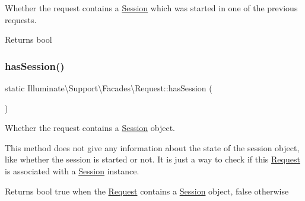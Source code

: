 Whether the request contains a \mbox{\hyperlink{class_illuminate_1_1_support_1_1_facades_1_1_session}{Session}} which was started in one of the previous requests.

\begin{DoxyReturn}{Returns}
bool 
\end{DoxyReturn}
\mbox{\label{class_illuminate_1_1_support_1_1_facades_1_1_request_abdb40f9f98e0988e0d46701d84b08eaa}} 
\subsubsection{\texorpdfstring{has\+Session()}{hasSession()}}
{\footnotesize\ttfamily static Illuminate\textbackslash{}\+Support\textbackslash{}\+Facades\textbackslash{}\+Request\+::has\+Session (\begin{DoxyParamCaption}{ }\end{DoxyParamCaption})\hspace{0.3cm}{\ttfamily [static]}}

Whether the request contains a \mbox{\hyperlink{class_illuminate_1_1_support_1_1_facades_1_1_session}{Session}} object.

This method does not give any information about the state of the session object, like whether the session is started or not. It is just a way to check if this \mbox{\hyperlink{class_illuminate_1_1_support_1_1_facades_1_1_request}{Request}} is associated with a \mbox{\hyperlink{class_illuminate_1_1_support_1_1_facades_1_1_session}{Session}} instance.

\begin{DoxyReturn}{Returns}
bool true when the \mbox{\hyperlink{class_illuminate_1_1_support_1_1_facades_1_1_request}{Request}} contains a \mbox{\hyperlink{class_illuminate_1_1_support_1_1_facades_1_1_session}{Session}} object, false otherwise 
\end{DoxyReturn}
\mbox{\label{class_illuminate_1_1_support_1_1_facades_1_1_request_a7e986c7ede7a776671568609fc13fc93}} 
